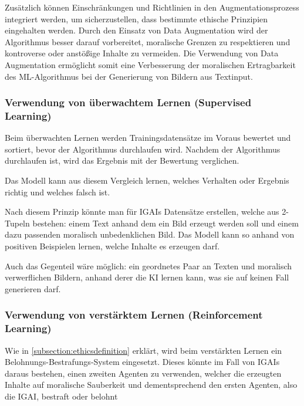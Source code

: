 \documentclass[12pt]{article}
\begin{document}
Zusätzlich können Einschränkungen und Richtlinien in den Augmentationsprozess integriert werden, um sicherzustellen, dass bestimmte ethische Prinzipien eingehalten werden. 
Durch den Einsatz von Data Augmentation wird der Algorithmus besser darauf vorbereitet, moralische Grenzen zu respektieren und kontroverse oder anstößige Inhalte zu vermeiden. 
Die Verwendung von Data Augmentation ermöglicht somit eine Verbesserung der moralischen Ertragbarkeit des ML-Algorithmus bei der Generierung von Bildern aus Textinput.


\subsubsection{Verwendung von überwachtem Lernen (Supervised Learning)}
Beim überwachten Lernen werden Trainingsdatensätze im Voraus bewertet und sortiert, bevor der Algorithmus durchlaufen wird. Nachdem der Algorithmus durchlaufen ist, wird das Ergebnis mit der Bewertung verglichen. 
 
Das Modell kann aus diesem Vergleich lernen, welches Verhalten oder Ergebnis richtig und welches falsch ist.

Nach diesem Prinzip könnte man für IGAIs Datensätze erstellen, welche aus 2-Tupeln bestehen: einem Text anhand dem ein Bild erzeugt werden soll und einem dazu passenden moralisch unbedenklichen Bild. 
Das Modell kann so anhand von positiven Beispielen lernen, welche Inhalte es erzeugen darf.

Auch das Gegenteil wäre möglich: ein geordnetes Paar an Texten und moralisch verwerflichen Bildern, anhand derer die KI lernen kann, was sie auf keinen Fall generieren darf.


\subsubsection{Verwendung von verstärktem Lernen (Reinforcement Learning)}
Wie in \ref{subsection:ethicsdefinition} erklärt, wird beim verstärkten Lernen ein Belohnungs-Bestrafungs-System eingesetzt. Dieses könnte im Fall von IGAIs daraus bestehen, einen zweiten Agenten zu verwenden, welcher die erzeugten Inhalte auf moralische Sauberkeit und dementsprechend den ersten Agenten, also die IGAI, bestraft oder belohnt
\end{document}
